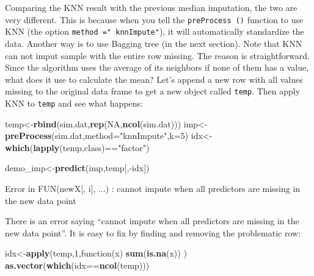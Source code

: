\documentclass[]{book}
\newenvironment{Shaded}{\begin{snugshade}}{\end{snugshade}}
\newcommand{\KeywordTok}[1]{\textcolor[rgb]{0.13,0.29,0.53}{\textbf{{#1}}}}
\newcommand{\DataTypeTok}[1]{\textcolor[rgb]{0.13,0.29,0.53}{{#1}}}
\newcommand{\DecValTok}[1]{\textcolor[rgb]{0.00,0.00,0.81}{{#1}}}
\newcommand{\StringTok}[1]{\textcolor[rgb]{0.31,0.60,0.02}{{#1}}}
\newcommand{\OtherTok}[1]{\textcolor[rgb]{0.56,0.35,0.01}{{#1}}}
\newcommand{\NormalTok}[1]{{#1}}
\theoremstyle{definition}
\theoremstyle{definition}
\theoremstyle{remark}
\begin{document}
Comparing the KNN result with the previous median imputation, the two
are very different. This is because when you tell the
\texttt{preProcess\ ()} function to use KNN (the option
\texttt{method\ ="\ knnImpute"}), it will automatically standardize the
data. Another way is to use Bagging tree (in the next section). Note
that KNN can not imput sample with the entire row missing. The reason is
straightforward. Since the algorithm uses the average of its neighbors
if none of them has a value, what does it use to calculate the mean?
Let's append a new row with all values missing to the original data
frame to get a new object called \texttt{temp}. Then apply KNN to
\texttt{temp} and see what happens:

\begin{Shaded}
\begin{Highlighting}[]
\NormalTok{temp<-}\KeywordTok{rbind}\NormalTok{(sim.dat,}\KeywordTok{rep}\NormalTok{(}\OtherTok{NA}\NormalTok{,}\KeywordTok{ncol}\NormalTok{(sim.dat)))}
\NormalTok{imp<-}\KeywordTok{preProcess}\NormalTok{(sim.dat,}\DataTypeTok{method=}\StringTok{"knnImpute"}\NormalTok{,}\DataTypeTok{k=}\DecValTok{5}\NormalTok{)}
\NormalTok{idx<-}\KeywordTok{which}\NormalTok{(}\KeywordTok{lapply}\NormalTok{(temp,class)==}\StringTok{"factor"}\NormalTok{)}
\end{Highlighting}
\end{Shaded}

\begin{Shaded}
\begin{Highlighting}[]
\NormalTok{demo_imp<-}\KeywordTok{predict}\NormalTok{(imp,temp[,-idx])}
\end{Highlighting}
\end{Shaded}

\begin{Shaded}
\begin{Highlighting}[]
\NormalTok{Error in FUN(newX[, i], ...) : }
  \NormalTok{cannot impute when all predictors are missing in the new data point}
\end{Highlighting}
\end{Shaded}

There is an error saying ``cannot impute when all predictors are missing
in the new data point''. It is easy to fix by finding and removing the
problematic row:

\begin{Shaded}
\begin{Highlighting}[]
\NormalTok{idx<-}\KeywordTok{apply}\NormalTok{(temp,}\DecValTok{1}\NormalTok{,function(x) }\KeywordTok{sum}\NormalTok{(}\KeywordTok{is.na}\NormalTok{(x)) )}
\KeywordTok{as.vector}\NormalTok{(}\KeywordTok{which}\NormalTok{(idx==}\KeywordTok{ncol}\NormalTok{(temp)))}
\end{Highlighting}
\end{Shaded}
\end{document}
